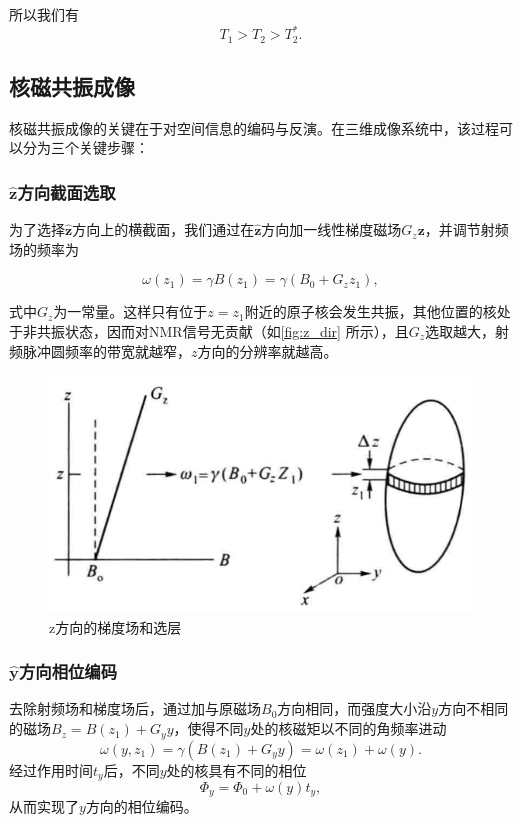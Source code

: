 \documentclass[font=default]{mpltx}
\begin{document}
  所以我们有
	\begin{equation}
		T_1>T_2>T_2^*.
	\end{equation}
\subsection{核磁共振成像}
核磁共振成像的关键在于对空间信息的编码与反演。在三维成像系统中，该过程可以分为三个关键步骤：

\subsubsection{$\hat{\bm{z}}$方向截面选取}

为了选择$\hat{\bm{z}}$方向上的横截面，我们通过在$\hat{\bm{z}}$方向加一线性梯度磁场$G_z\bm{z}$，并调节射频场的频率为

\begin{equation}
  \omega(z_1) = \gamma B(z_1) = \gamma(B_0 + G_z z_1),
\end{equation}

式中$G_z$为一常量。这样只有位于$z=z_1$附近的原子核会发生共振，其他位置的核处于非共振状态，因而对NMR信号无贡献（如\autoref{fig:z_dir} 所示），且$G_z$选取越大，射频脉冲圆频率的带宽就越窄，$z$方向的分辨率就越高。
\begin{figure}
  \centering
  \includegraphics[width=0.4\linewidth]{fig/z_dir.png}
  \caption{z方向的梯度场和选层}
  \label{fig:z_dir}
\end{figure}

\subsubsection{$\hat{\bm{y}}$方向相位编码}

去除射频场和梯度场后，通过加与原磁场$B_0$方向相同，而强度大小沿$y$方向不相同的磁场$B_z =B(z_1)+ G_y y$，使得不同$y$处的核磁矩以不同的角频率进动
\begin{equation}
  \omega(y,z_1)=\gamma(B(z_1)+G_y y)=\omega(z_1)+\omega(y).
\end{equation}
经过作用时间$t_y$后，不同$y$处的核具有不同的相位
\begin{equation}
  \Phi_y = \Phi_0 + \omega(y)t_y ,
\end{equation}
从而实现了$y$方向的相位编码。
\end{document}
